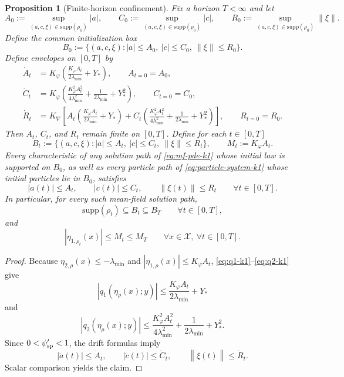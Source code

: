 \documentclass[11pt]{article}
\newtheorem{proposition}[theorem]{Proposition}
\theoremstyle{definition}
\newcommand{\supp}{\mathrm{supp}}
\newcommand{\norm}[1]{\left\lVert #1 \right\rVert}
\newcommand{\mc}[1]{\mathcal{#1}}
\begin{document}
\begin{proposition}[Finite-horizon confinement]
\label{prop:softplus-confinement-k1}
Fix a horizon $T<\infty$ and let
\[
  A_0:=\sup_{(a,c,\xi)\in\supp(\rho_0)}|a|,
  \qquad
  C_0:=\sup_{(a,c,\xi)\in\supp(\rho_0)}|c|,
  \qquad
  R_0:=\sup_{(a,c,\xi)\in\supp(\rho_0)}\norm{\xi}.
\]
Define the common initialization box
\[
  B_0
  :=
  \{(a,c,\xi): |a|\le A_0,\ |c|\le C_0,\ \norm{\xi}\le R_0\}.
\]
Define envelopes on $[0,T]$ by
\begin{align}
  \dot A_t
  &=
  K_\varphi\left(\frac{K_\varphi A_t}{2\lambda_{\min}}+Y_\ast\right),
  \qquad
  A_{t=0}=A_0,
  \label{eq:A-envelope-k1}
  \\
  \dot C_t
  &=
  K_\varphi\left(
    \frac{K_\varphi^2 A_t^2}{4\lambda_{\min}^2}
    +
    \frac{1}{2\lambda_{\min}}
    +
    Y_\ast^2
  \right),
  \qquad
  C_{t=0}=C_0,
  \label{eq:C-envelope-k1}
  \\
  \dot R_t
  &=
  K_{\nabla}\left[
    A_t\left(\frac{K_\varphi A_t}{2\lambda_{\min}}+Y_\ast\right)
    +
    C_t\left(
      \frac{K_\varphi^2 A_t^2}{4\lambda_{\min}^2}
      +
      \frac{1}{2\lambda_{\min}}
      +
      Y_\ast^2
    \right)
  \right],
  \qquad
  R_{t=0}=R_0.
  \label{eq:R-envelope-k1}
\end{align}
Then $A_t$, $C_t$, and $R_t$ remain finite on $[0,T]$. Define for each
$t\in[0,T]$
\[
  B_t
  :=
  \{(a,c,\xi): |a|\le A_t,\ |c|\le C_t,\ \norm{\xi}\le R_t\},
  \qquad
  M_t:=K_\varphi A_t.
\]
Every characteristic of any solution path of \eqref{eq:mf-pde-k1} whose
initial law is supported on $B_0$, as well as every particle path of
\eqref{eq:particle-system-k1} whose initial particles lie in $B_0$, satisfies
\[
  |a(t)|\le A_t,
  \qquad
  |c(t)|\le C_t,
  \qquad
  \norm{\xi(t)}\le R_t
  \qquad
  \forall t\in[0,T].
\]
In particular, for every such mean-field solution path,
\[
  \supp(\rho_t)\subseteq B_t\subseteq B_T
  \qquad
  \forall t\in[0,T],
\]
and
\[
  |\eta_{1,\rho_t}(x)|\le M_t\le M_T
  \qquad
  \forall x\in\mc{X},\ \forall t\in[0,T].
\]
\end{proposition}

\begin{proof}
Because $\eta_{2,\rho}(x)\le -\lambda_{\min}$ and
$|\eta_{1,\rho}(x)|\le K_\varphi A_t$, \eqref{eq:q1-k1}--\eqref{eq:q2-k1}
give
\[
  |q_1(\eta_\rho(x);y)|
  \le
  \frac{K_\varphi A_t}{2\lambda_{\min}}+Y_\ast
\]
and
\[
  |q_2(\eta_\rho(x);y)|
  \le
  \frac{K_\varphi^2 A_t^2}{4\lambda_{\min}^2}
  +
  \frac{1}{2\lambda_{\min}}
  +
  Y_\ast^2.
\]
Since $0<\psi'_{\rm sp}<1$, the drift formulas imply
\[
  |\dot a(t)|\le \dot A_t,
  \qquad
  |\dot c(t)|\le \dot C_t,
  \qquad
  \norm{\dot\xi(t)}\le \dot R_t.
\]
Scalar comparison yields the claim.
\end{proof}
\end{document}
